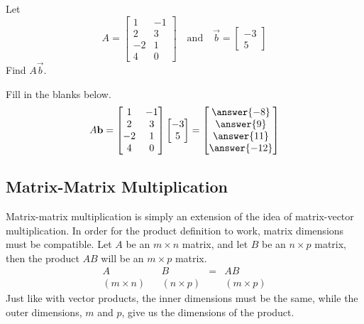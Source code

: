 \documentclass{ximera}
\begin{document}
\begin{example}
Let $$A=\begin{bmatrix}1&-1\\2&3\\-2&1\\4&0\end{bmatrix}\quad\text{and}\quad\vec{b}=\begin{bmatrix}-3\\5\end{bmatrix}
$$
Find $A\vec{b}$.
\begin{explanation}
Fill in the blanks below.  
$$A\vec{b}=\begin{bmatrix}1&-1\\2&3\\-2&1\\4&0\end{bmatrix}\begin{bmatrix}-3\\5\end{bmatrix}=\begin{bmatrix}\answer{-8}\\\answer{9}\\\answer{11}\\\answer{-12}\end{bmatrix}
$$
\end{explanation}
\end{example}

\subsection*{Matrix-Matrix Multiplication}

Matrix-matrix multiplication is simply an extension of the idea of matrix-vector multiplication.  In order for the product definition to work, matrix dimensions must be compatible.  Let $A$ be an $m\times n$ matrix, and let $B$ be an $n\times p$ matrix, then the product $AB$ will be an $m\times p$ matrix.
$$\begin{array}{ccccc}
A& & B &=& AB\\
(m\times n) & &(n\times p) & &(m\times p)
\end{array}$$
Just like with vector products, the inner dimensions must be the same, while the outer dimensions, $m$ and $p$, give us the dimensions of the product.
\end{document}
